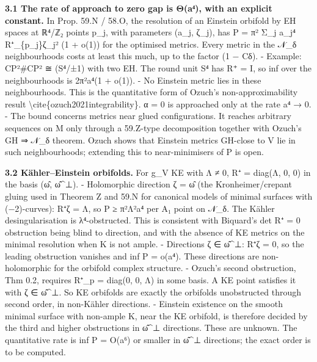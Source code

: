 \documentclass[
  10pt,
]{report}
\begin{document}
\textbf{3.1 The rate of approach to zero gap is Θ(a⁴), with an explicit
constant.} In Prop. 59.N / 58.O, the resolution of an Einstein orbifold
by EH spaces at ℝ⁴/ℤ₂ points p\_j, with parameters (a\_j, ζ\_j), has P =
π² Σ\_j a\_j⁴ \textbar R⁺\_\{p\_j\}ζ\_j\textbar² (1 + o(1)) for the
optimised metrics. Every metric in the 𝒩\_δ neighbourhoods costs at
least this much, up to the factor (1 − Cδ). - Example: CP²\#CP² ≅
(S⁴/±1) with two EH. The round unit S⁴ has R⁺ = I, so inf over the
neighbourhoods is 2π²a⁴(1 + o(1)). - No Einstein metric lies in these
neighbourhoods. This is the quantitative form of Ozuch's
non-approximability result
\textbackslash cite\{ozuch2021integrability\}. α = 0 is approached only
at the rate a⁴ → 0. - The bound concerns metrics near glued
configurations. It reaches arbitrary sequences on M only through a
59.Z-type decomposition together with Ozuch's GH ⇒ 𝒩\_δ theorem. Ozuch
shows that Einstein metrics GH-close to V lie in such neighbourhoods;
extending this to near-minimisers of P is open.

\textbf{3.2 Kähler--Einstein orbifolds.} For g\_V KE with Λ ≠ 0, R⁺ =
diag(Λ, 0, 0) in the basis (ω̂, ω̂\^{}⊥). - Holomorphic direction ζ = ω̂
(the Kronheimer/crepant gluing used in Theorem Z and 59.N for canonical
models of minimal surfaces with (−2)-curves): \textbar R⁺ζ\textbar{} =
\textbar Λ\textbar, so P ≥ π²Λ²a⁴ per A₁ point on 𝒩\_δ. The Kähler
desingularisation is λ⁴-obstructed. This is consistent with Biquard's
det R⁺ = 0 obstruction being blind to direction, and with the absence of
KE metrics on the minimal resolution when K is not ample. - Directions ζ
∈ ω̂\^{}⊥: R⁺ζ = 0, so the leading obstruction vanishes and inf P =
o(a⁴). These directions are non-holomorphic for the orbifold complex
structure. - Ozuch's second obstruction, Thm 0.2, requires R⁺\_p =
diag(0, 0, Λ) in some basis. A KE point satisfies it with ζ ∈ ω̂\^{}⊥. So
KE orbifolds are exactly the orbifolds unobstructed through second
order, in non-Kähler directions. - Einstein existence on the smooth
minimal surface with non-ample K, near the KE orbifold, is therefore
decided by the third and higher obstructions in ω̂\^{}⊥ directions. These
are unknown. The quantitative rate is inf P = O(a⁶) or smaller in ω̂\^{}⊥
directions; the exact order is to be computed.
\end{document}
